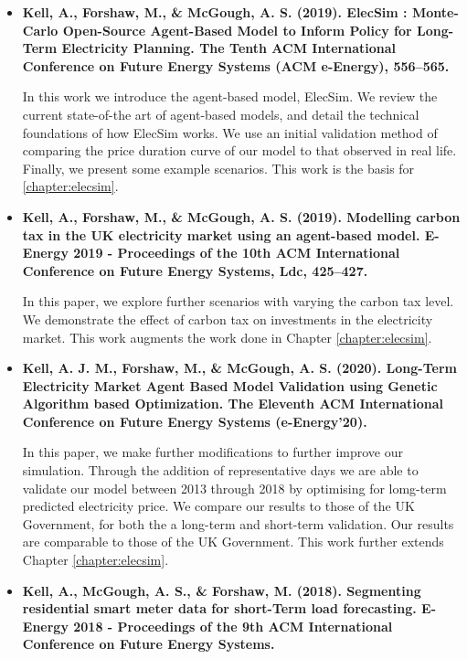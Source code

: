\begin{itemize}
	
	\item[\textbf{\cite{Kell}}] \textbf{Kell, A., Forshaw, M., \& McGough, A. S. (2019). ElecSim : Monte-Carlo Open-Source Agent-Based Model to Inform Policy for Long-Term Electricity Planning. The Tenth ACM International Conference on Future Energy Systems (ACM e-Energy), 556–565.}
	
	In this work we introduce the agent-based model, ElecSim. We review the current state-of-the art of agent-based models, and detail the technical foundations of how ElecSim works. We use an initial validation method of comparing the price duration curve of our model to that observed in real life. Finally, we present some example scenarios. This work is the basis for \ref{chapter:elecsim}.
	
	\item[\textbf{\cite{Kell2019a}}] \textbf{Kell, A., Forshaw, M., \& McGough, A. S. (2019). Modelling carbon tax in the UK electricity market using an agent-based model. E-Energy 2019 - Proceedings of the 10th ACM International Conference on Future Energy Systems, Ldc, 425–427. }
	
	In this paper, we explore further scenarios with varying the carbon tax level. We demonstrate the effect of carbon tax on investments in the electricity market. This work augments the work done in Chapter \ref{chapter:elecsim}.
	
	
	\item[\textbf{\cite{Kell2020b}}] \textbf{Kell, A. J. M., Forshaw, M., \& McGough, A. S. (2020). Long-Term Electricity Market Agent Based Model Validation using Genetic Algorithm based Optimization. The Eleventh ACM International Conference on Future Energy Systems (e-Energy’20).}
		
	In this paper, we make further modifications to further improve our simulation. Through the addition of representative days we are able to validate our model between 2013 through 2018 by optimising for lomg-term predicted electricity price. We compare our results to those of the UK Government, for both the a long-term and short-term validation. Our results are comparable to those of the UK Government. This work further extends Chapter \ref{chapter:elecsim}.
	
	\item[\textbf{\cite{Kell2018a}}] \textbf{Kell, A., McGough, A. S., \& Forshaw, M. (2018). Segmenting residential smart meter data for short-Term load forecasting. E-Energy 2018 - Proceedings of the 9th ACM International Conference on Future Energy Systems.}
	

\end{itemize}
